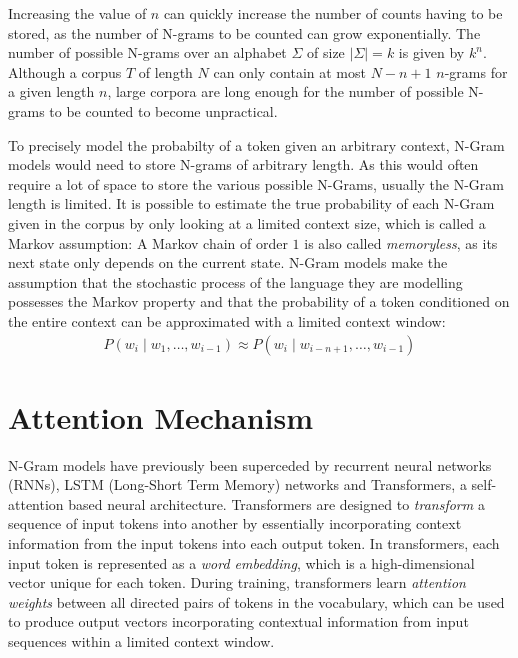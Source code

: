 Increasing the value of $n$ can quickly increase the number of counts having to be stored, as the number of N-grams to be counted can grow exponentially. The number of possible N-grams over an alphabet $\Sigma$ of size $|\Sigma| = k$ is given by $k^n$. Although a corpus $T$ of length $N$ can only contain at most $N - n + 1$ $n$-grams for a given length $n$, large corpora are long enough for the number of possible N-grams to be counted to become unpractical.

To precisely model the probabilty of a token given an arbitrary context, N-Gram models would need to store N-grams of arbitrary length. As this would often require a lot of space to store the various possible N-Grams, usually the N-Gram length is limited. It is possible to estimate the true probability of each N-Gram given in the corpus by only looking at a limited context size, which is called a Markov assumption:
A Markov chain of order $1$ is also called \textit{memoryless}, as its next state only depends on the current state. N-Gram models make the assumption that the stochastic process of the language they are modelling possesses the Markov property and that the probability of a token conditioned on the entire context can be approximated with a limited context window:
\begin{align*}
    P(w_i \mid w_{1}, \ldots, w_{i-1}) \approx P(w_i \mid w_{i - n + 1}, \ldots, w_{i-1})
\end{align*}

\section{Attention Mechanism}
N-Gram models have previously been superceded by recurrent neural networks (RNNs), LSTM (Long-Short Term Memory) networks and Transformers, a self-attention based neural architecture. Transformers are designed to \textit{transform} a sequence of input tokens into another by essentially incorporating context information from the input tokens into each output token. In transformers, each input token is represented as a \textit{word embedding}, which is a high-dimensional vector unique for each token. During training, transformers learn \textit{attention weights} between all directed pairs of tokens in the vocabulary, which can be used to produce output vectors incorporating contextual information from input sequences within a limited context window.

